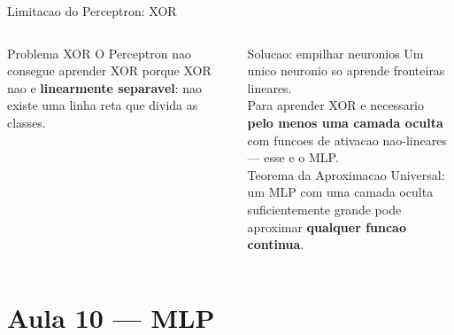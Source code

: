 \documentclass[aspectratio=169, 10pt]{beamer}
\begin{document}
\begin{frame}{Limitacao do Perceptron: XOR}
\begin{columns}
\begin{block}{Problema XOR}
  O Perceptron nao consegue aprender XOR porque XOR nao e 
  \textbf{linearmente separavel}: nao existe uma linha reta que 
  divida as classes.

  \begin{center}
  \end{center}
\end{block}

\begin{alertblock}{Solucao: empilhar neuronios}
  Um unico neuronio so aprende fronteiras lineares.\\
  \vspace{0.4em}
  Para aprender XOR e necessario \textbf{pelo menos uma camada oculta} 
  com funcoes de ativacao nao-lineares --- esse e o MLP.\\
  \vspace{0.4em}
  Teorema da Aproximacao Universal: um MLP com uma camada oculta 
  suficientemente grande pode aproximar \textbf{qualquer funcao continua}.
\end{alertblock}
\end{columns}
\end{frame}

\section{Aula 10 — MLP}
\end{document}
